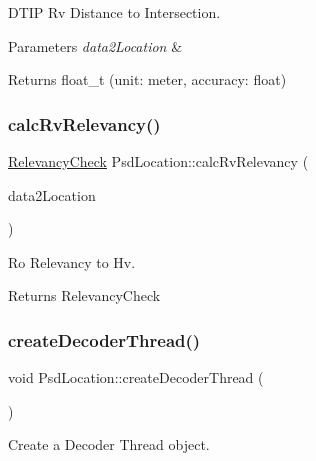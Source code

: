 D\+T\+IP Rv Distance to Intersection. 


\begin{DoxyParams}{Parameters}
{\em data2\+Location} & \\
\hline
\end{DoxyParams}
\begin{DoxyReturn}{Returns}
float\+\_\+t (unit\+: meter, accuracy\+: float) 
\end{DoxyReturn}
\mbox{\label{class_psd_location_a9f1a98a1ba23af93df973502332cf10f}} 
\subsubsection{\texorpdfstring{calc\+Rv\+Relevancy()}{calcRvRelevancy()}}
{\footnotesize\ttfamily \hyperlink{_psd_location_8h_ad3abb902810ad80bbc508a024f5af264}{Relevancy\+Check} Psd\+Location\+::calc\+Rv\+Relevancy (\begin{DoxyParamCaption}\item[{\hyperlink{_psd_location_8h_a1e3a92020005d2a81aa50ba5ae9b129c}{Data2\+Location}}]{data2\+Location }\end{DoxyParamCaption})}



Ro Relevancy to Hv. 

\begin{DoxyReturn}{Returns}
Relevancy\+Check 
\end{DoxyReturn}
\mbox{\label{class_psd_location_a99798cafd2c4257230d9b74215325da0}} 
\subsubsection{\texorpdfstring{create\+Decoder\+Thread()}{createDecoderThread()}}
{\footnotesize\ttfamily void Psd\+Location\+::create\+Decoder\+Thread (\begin{DoxyParamCaption}{ }\end{DoxyParamCaption})}



Create a Decoder Thread object. 


